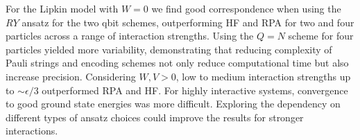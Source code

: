 
For the Lipkin model with $W=0$ we find good correspondence when using the $RY$ ansatz for the two qbit schemes, outperforming HF and RPA for two and four particles across a range of interaction strengths. Using the $Q = N$ scheme for four particles yielded more variability, demonstrating that reducing complexity of Pauli strings and encoding schemes not only reduce computational time but also increase precision. Considering $W, V > 0$, low to medium interaction strengths up to $\sim \epsilon/3$ outperformed RPA and HF. For highly interactive systems, convergence to good ground state energies was more difficult. Exploring the dependency on different types of ansatz choices could improve the results for stronger interactions.